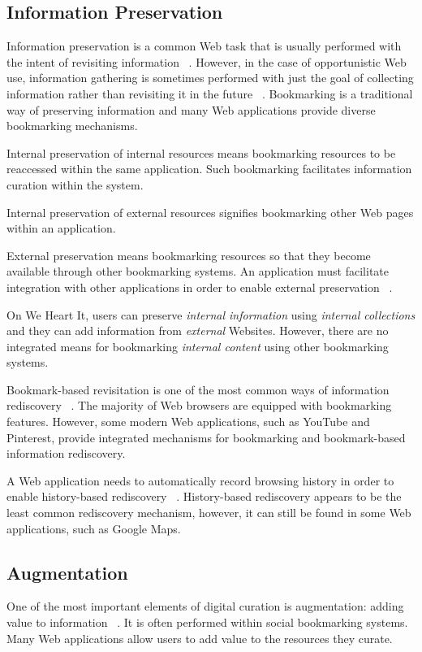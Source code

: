 {{} %

{\subsection{Information Preservation}
Information preservation is a common Web task that is usually performed with the intent of revisiting information ~\cite{abrams, wittaker}. However, in the case of opportunistic Web use, information gathering is sometimes performed with just the goal of collecting information rather than revisiting it in the future ~\cite{lindley}. Bookmarking is a traditional way of preserving information and many Web applications provide diverse bookmarking mechanisms. 

Internal preservation of internal resources means bookmarking resources to be reaccessed within the same application. Such bookmarking facilitates information curation within the system.

Internal preservation of external resources signifies bookmarking other Web pages within an application. 
  
External preservation means bookmarking resources so that they become available through other bookmarking systems. An application must facilitate integration with other applications in order to enable external preservation ~\cite{abrams}.

On We Heart It, users can preserve \textit{internal  information} using \textit{internal collections} and they can add information from \textit{external} Websites. However, there are no integrated means for bookmarking \textit{internal content} using other bookmarking systems.  


Bookmark-based revisitation is one of the most common ways of information rediscovery ~\cite{abrams}. The majority of Web browsers are equipped with bookmarking features. However, some modern Web applications, such as YouTube and Pinterest, provide integrated mechanisms for bookmarking and bookmark-based information rediscovery. 

A Web application needs to automatically record browsing history in order to enable history-based rediscovery ~\cite{tauscher}. History-based rediscovery appears to be the least common rediscovery mechanism, however, it can still be found in some Web applications, such as Google Maps.
} %

{\subsection{Augmentation}
One of the most important elements of digital curation is augmentation: adding value to information ~\cite{beagrie, wittaker}. It is often performed within social bookmarking systems. Many Web applications allow users to add value to the resources they curate. 

}}
